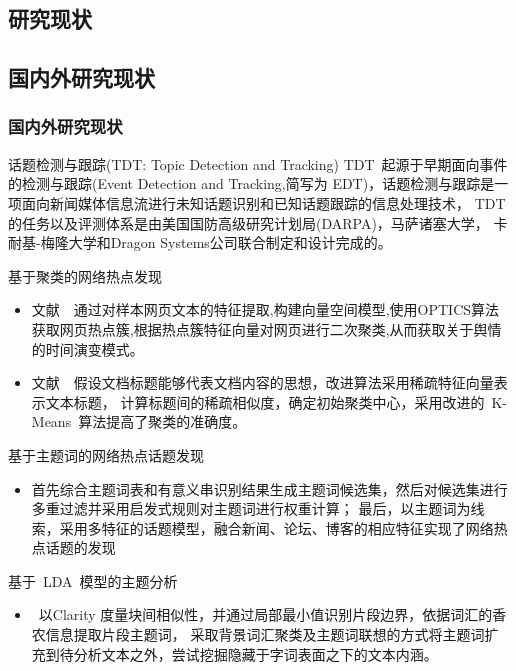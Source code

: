 \documentclass[CJKutf8, table]{beamer}
\begin{document}
\begin{CJK}{UTF8}{gbsn}
\section{研究现状}
\subsection{国内外研究现状}
\begin{frame}
  \frametitle{国内外研究现状}
  \begin{tiny}
    \begin{block}{话题检测与跟踪(TDT: Topic Detection and Tracking)}
      TDT~起源于早期面向事件的检测与跟踪(Event Detection and Tracking,简写为
      EDT)，话题检测与跟踪是一项面向新闻媒体信息流进行未知话题识别和已知话题跟踪的信息处理技术，
      TDT的任务以及评测体系是由美国国防高级研究计划局(DARPA)，马萨诸塞大学，
      卡耐基-梅隆大学和Dragon Systems公司联合制定和设计完成的\cite{Yu Hong}。
    \end{block}
    \pause
    \begin{block}{基于聚类的网络热点发现}
      \begin{itemize}
        \item{文献~\cite{Wang}~通过对样本网页文本的特征提取,构建向量空间模型,使用OPTICS算法获取网页热点簇,根据热点簇特征向量对网页进行二次聚类,从而获取关于舆情的时间演变模式。}
        \item{文献~\cite{Tang}~假设文档标题能够代表文档内容的思想，改进算法采用稀疏特征向量表示文本标题，
          计算标题间的稀疏相似度，确定初始聚类中心，采用改进的~K-Means~算法提高了聚类的准确度。}
        \end{itemize}
    \end{block}
    \pause
    \begin{block}{基于主题词的网络热点话题发现}
      \begin{itemize}
        \item{\cite{Li}首先综合主题词表和有意义串识别结果生成主题词候选集，然后对候选集进行多重过滤并采用启发式规则对主题词进行权重计算；
          最后，以主题词为线索，采用多特征的话题模型，融合新闻、论坛、博客的相应特征实现了网络热点话题的发现}
        \end{itemize}
    \end{block}
    \pause
    \begin{block}{基于~LDA~模型的主题分析}
      \begin{itemize}
        \item{\cite{Shi}~以Clarity 度量块间相似性，并通过局部最小值识别片段边界，依据词汇的香农信息提取片段主题词，
          采取背景词汇聚类及主题词联想的方式将主题词扩充到待分析文本之外，尝试挖掘隐藏于字词表面之下的文本内涵。}
        \end{itemize}
    \end{block}
  \end{tiny}
\end{frame}


\end{CJK}
\end{document}
